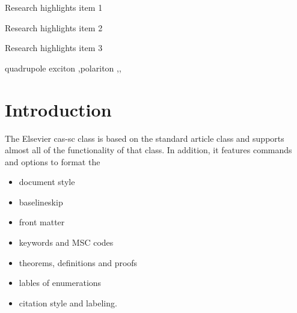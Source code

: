 \documentclass[a4paper,fleqn]{cas-sc}
\begin{document}
	\begin{abstract}
		This template helps you to create a properly formatted \LaTeX\ manuscript.
		
		\noindent\texttt{\textbackslash begin{abstract}} \dots 
		\texttt{\textbackslash end{abstract}} and
		\verb+\begin{keyword}+ \verb+...+ \verb+\end{keyword}+ 
		which
		contain the abstract and keywords respectively. 
		Each keyword shall be separated by a \verb+\sep+ command.
	\end{abstract}
	
	\begin{graphicalabstract}
	\end{graphicalabstract}
	
	\begin{highlights}
		\item Research highlights item 1
		\item Research highlights item 2
		\item Research highlights item 3
	\end{highlights}
	
	\begin{keywords}
		quadrupole exciton \sep polariton \sep \WGM \sep \BEC
	\end{keywords}
	
	
	\maketitle
	
	
	\section{Introduction}
	
	The Elsevier cas-sc class is based on the
	standard article class and supports almost all of the functionality of
	that class. In addition, it features commands and options to format the
	\begin{itemize} \item document style \item baselineskip \item front
		matter \item keywords and MSC codes \item theorems, definitions and
		proofs \item lables of enumerations \item citation style and labeling.
	\end{itemize}
	
\end{document}
